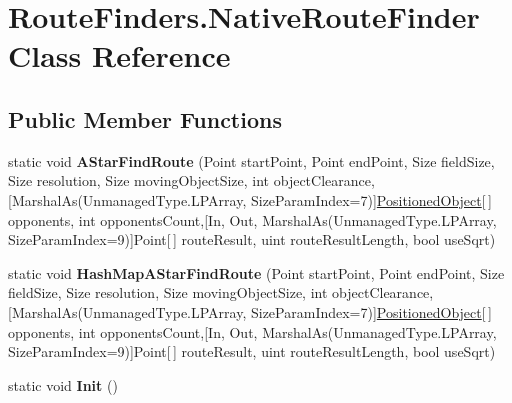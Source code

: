 \hypertarget{class_route_finders_1_1_native_route_finder}{\section{Route\-Finders.\-Native\-Route\-Finder Class Reference}
\label{class_route_finders_1_1_native_route_finder}
}
\subsection*{Public Member Functions}
\begin{DoxyCompactItemize}
\item 
\hypertarget{class_route_finders_1_1_native_route_finder_ab58a0f118fc90efeab3b340f6b87789f}{static void {\bfseries A\-Star\-Find\-Route} (Point start\-Point, Point end\-Point, Size field\-Size, Size resolution, Size moving\-Object\-Size, int object\-Clearance,\mbox{[}Marshal\-As(Unmanaged\-Type.\-L\-P\-Array, Size\-Param\-Index=7)\mbox{]}\hyperlink{struct_route_finders_1_1_positioned_object}{Positioned\-Object}\mbox{[}$\,$\mbox{]} opponents, int opponents\-Count,\mbox{[}In, Out, Marshal\-As(Unmanaged\-Type.\-L\-P\-Array, Size\-Param\-Index=9)\mbox{]}Point\mbox{[}$\,$\mbox{]} route\-Result, uint route\-Result\-Length, bool use\-Sqrt)}\label{class_route_finders_1_1_native_route_finder_ab58a0f118fc90efeab3b340f6b87789f}

\item 
\hypertarget{class_route_finders_1_1_native_route_finder_a134666ff80b8d47ac0abf094ee45ab9d}{static void {\bfseries Hash\-Map\-A\-Star\-Find\-Route} (Point start\-Point, Point end\-Point, Size field\-Size, Size resolution, Size moving\-Object\-Size, int object\-Clearance,\mbox{[}Marshal\-As(Unmanaged\-Type.\-L\-P\-Array, Size\-Param\-Index=7)\mbox{]}\hyperlink{struct_route_finders_1_1_positioned_object}{Positioned\-Object}\mbox{[}$\,$\mbox{]} opponents, int opponents\-Count,\mbox{[}In, Out, Marshal\-As(Unmanaged\-Type.\-L\-P\-Array, Size\-Param\-Index=9)\mbox{]}Point\mbox{[}$\,$\mbox{]} route\-Result, uint route\-Result\-Length, bool use\-Sqrt)}\label{class_route_finders_1_1_native_route_finder_a134666ff80b8d47ac0abf094ee45ab9d}

\item 
\hypertarget{class_route_finders_1_1_native_route_finder_ac84f266238d459d6642ab79c996c4652}{static void {\bfseries Init} ()}\label{class_route_finders_1_1_native_route_finder_ac84f266238d459d6642ab79c996c4652}

\end{DoxyCompactItemize}


